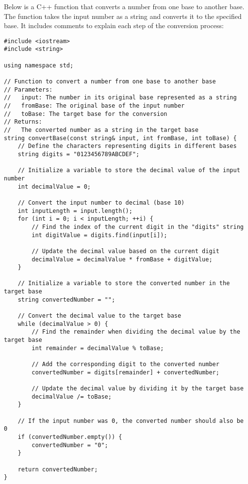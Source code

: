 \documentclass{article}
\begin{document}
Below is a C++ function that converts a number from one base to another base. The function takes the input number as a string and converts it to the specified base. It includes comments to explain each step of the conversion process:
\begin{verbatim}
#include <iostream>
#include <string>

using namespace std;

// Function to convert a number from one base to another base
// Parameters:
//   input: The number in its original base represented as a string
//   fromBase: The original base of the input number
//   toBase: The target base for the conversion
// Returns:
//   The converted number as a string in the target base
string convertBase(const string& input, int fromBase, int toBase) {
    // Define the characters representing digits in different bases
    string digits = "0123456789ABCDEF";

    // Initialize a variable to store the decimal value of the input number
    int decimalValue = 0;

    // Convert the input number to decimal (base 10)
    int inputLength = input.length();
    for (int i = 0; i < inputLength; ++i) {
        // Find the index of the current digit in the "digits" string
        int digitValue = digits.find(input[i]);

        // Update the decimal value based on the current digit
        decimalValue = decimalValue * fromBase + digitValue;
    }

    // Initialize a variable to store the converted number in the target base
    string convertedNumber = "";

    // Convert the decimal value to the target base
    while (decimalValue > 0) {
        // Find the remainder when dividing the decimal value by the target base
        int remainder = decimalValue % toBase;

        // Add the corresponding digit to the converted number
        convertedNumber = digits[remainder] + convertedNumber;

        // Update the decimal value by dividing it by the target base
        decimalValue /= toBase;
    }

    // If the input number was 0, the converted number should also be 0
    if (convertedNumber.empty()) {
        convertedNumber = "0";
    }

    return convertedNumber;
}
\end{verbatim}
\end{document}
